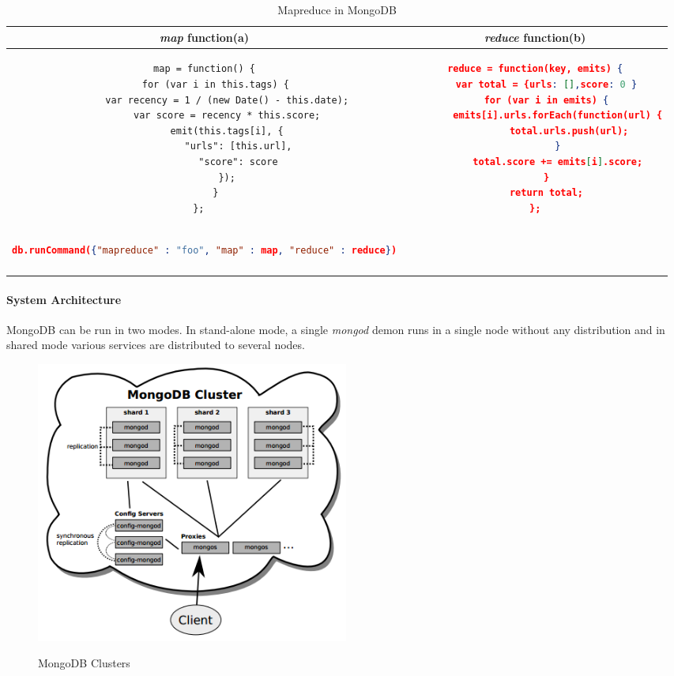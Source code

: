 \begin{longtable}{c|c}
	{\textit{map}} function(a) & {\textit{reduce}} function(b)\\
	\hline
	\begin{minipage}{.4\textwidth}
		\centering		
		\begin{lstlisting}[language=XML,basicstyle = \tiny,label=couchbase-map-sample]
map = function() {
	for (var i in this.tags) {
		var recency = 1 / (new Date() - this.date);
		var score = recency * this.score;
		emit(this.tags[i], {
			"urls": [this.url],
			"score": score
		});
	}
};	
		\end{lstlisting}		
	\end{minipage} &
	\begin{minipage}{.55\textwidth}
		\centering
		\begin{lstlisting}[language=JSON, basicstyle =\tiny, label=couchbase-reduce-sample]
reduce = function(key, emits) {
	var total = {urls: [],score: 0 }
	for (var i in emits) {
		emits[i].urls.forEach(function(url) {
			total.urls.push(url);
		}
		total.score += emits[i].score;
	}
	return total;
};
		\end{lstlisting}
	\end{minipage}\\
	\hline
	\begin{minipage}{.55\textwidth}
	\begin{lstlisting}[language=JSON, basicstyle =\tiny,]
        db.runCommand({"mapreduce" : "foo", "map" : map, "reduce" : reduce})
    \end{lstlisting}
	\end{minipage}\\
	\caption{Mapreduce in MongoDB}
	\label{mongdb-mapreduce}\\
\end{longtable}


\paragraph{System Architecture}
MongoDB can be run in two modes. In stand-alone mode, a single \textit{mongod} demon runs in a single node without any distribution and in shared mode various services are distributed to several nodes. 
\begin{figure}[h]
	\centering
	\includegraphics[width=0.5\textwidth]{img/mongo/clusters}
	\label{fig:mongodb-clusters}
\caption{MongoDB Clusters}
\end{figure} %